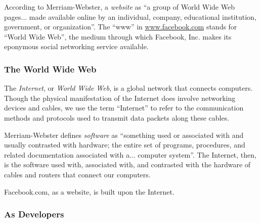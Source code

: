 \par According to Merriam-Webster, a \emph{website} as ``a group of World Wide Web pages... made available online by an individual, company, educational institution, government, or organization''. \cite{merriam_webster} The ``www'' in \url{www.facebook.com} stands for ``World Wide Web'', the medium through which Facebook, Inc. makes its eponymous social networking service available.

\subsubsection{The World Wide Web}


\par The \emph{Internet}, or \emph{World Wide Web}, is a global network that connects computers. \cite{cpe_464} Though the physical manifestation of the Internet does involve networking devices and cables, we use the term ``Internet'' to refer to the communication methods and protocols used to transmit data packets along these cables. \cite{cpe_464}


\par Merriam-Webster defines \emph{software} as ``something used or associated with and usually contrasted with hardware; the entire set of programs, procedures, and related documentation associated with a... computer system''. \cite{merriam_webster} The Internet, then, is the software used with, associated with, and contrasted with the hardware of cables and routers that connect our computers. 

\par Facebook.com, as a website, is built upon the Internet. \citeneeded 


\subsubsection{As Developers}

